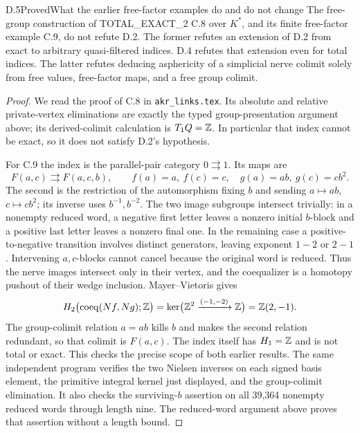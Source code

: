 \begin{claim}{D.5}{Proved}{What the earlier free-factor examples do and do not change}
\label{D:scope}
The free-group construction of TOTAL\_EXACT\_2 C.8 over $K^*$,
and its finite free-factor example C.9, do not refute D.2.
The former refutes an extension of D.2 from exact to arbitrary
quasi-filtered indices. D.4 refutes that extension even for
total indices. The latter refutes deducing asphericity of a
simplicial nerve colimit solely from free values, free-factor
maps, and a free group colimit.
\end{claim}
\begin{proof}
We read the proof of C.8 in \texttt{akr\_links.tex}. Its absolute
and relative private-vertex eliminations are exactly the typed
group-presentation argument above; its derived-colimit calculation
is $T_1Q=\mathbb Z$. In particular that index cannot be exact, so it
does not satisfy D.2's hypothesis.

For C.9 the index is the parallel-pair category
$0\rightrightarrows1$. Its maps are
\[
 F(a,c)\rightrightarrows F(a,c,b),\qquad
 f(a)=a,\ f(c)=c,\quad g(a)=ab,\ g(c)=cb^2.
\]
The second is the restriction of the automorphism fixing $b$
and sending $a\mapsto ab$, $c\mapsto cb^2$; its inverse uses
$b^{-1},b^{-2}$. The two image subgroups intersect trivially:
in a nonempty reduced word, a negative first letter leaves a
nonzero initial $b$-block and a positive last letter leaves a
nonzero final one. In the remaining case a positive-to-negative
transition involves distinct generators, leaving exponent
$1-2$ or $2-1$. Intervening $a,c$-blocks cannot cancel because
the original word is reduced. Thus the nerve images intersect
only in their vertex, and the coequalizer is a homotopy pushout
of their wedge inclusion. Mayer--Vietoris gives
\[
 H_2\bigl(\operatorname{coeq}(Nf,Ng);\mathbb Z\bigr)
 =\ker\bigl(\mathbb Z^2\xrightarrow{(-1,-2)}\mathbb Z\bigr)
 =\mathbb Z(2,-1).
\]
The group-colimit relation $a=ab$ kills $b$ and makes the
second relation redundant, so that colimit is $F(a,c)$.
The index itself has $H_1=\mathbb Z$ and is not total or exact.
This checks the precise scope of both earlier results.
The same independent program verifies the two Nielsen inverses on
each signed basis element, the primitive integral kernel just
displayed, and the group-colimit elimination. It also checks the
surviving-$b$ assertion on all 39,364 nonempty reduced words through
length nine. The reduced-word argument above proves that assertion
without a length bound.
\end{proof}

